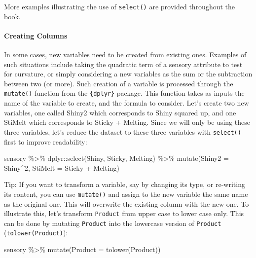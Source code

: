 \documentclass[
]{book}
\newenvironment{Shaded}{\begin{snugshade}}{\end{snugshade}}
\newcommand{\AttributeTok}[1]{\textcolor[rgb]{0.77,0.63,0.00}{#1}}
\newcommand{\DecValTok}[1]{\textcolor[rgb]{0.00,0.00,0.81}{#1}}
\newcommand{\FunctionTok}[1]{\textcolor[rgb]{0.00,0.00,0.00}{#1}}
\newcommand{\NormalTok}[1]{#1}
\newcommand{\SpecialCharTok}[1]{\textcolor[rgb]{0.00,0.00,0.00}{#1}}
\begin{document}
More examples illustrating the use of \texttt{select()} are provided throughout the book.

\hypertarget{creating-columns}{%
\paragraph{Creating Columns}\label{creating-columns}}

In some cases, new variables need to be created from existing ones. Examples of such situations include taking the quadratic term of a sensory attribute to test for curvature, or simply considering a new variables as the sum or the subtraction between two (or more). Such creation of a variable is processed through the \texttt{mutate()} function from the \texttt{\{dplyr\}} package. This function takes as inputs the name of the variable to create, and the formula to consider.
Let's create two new variables, one called Shiny2 which corresponds to Shiny squared up, and one StiMelt which corresponds to Sticky + Melting. Since we will only be using these three variables, let's reduce the dataset to these three variables with \texttt{select()} first to improve readability:

\begin{Shaded}
\begin{Highlighting}[]
\NormalTok{sensory }\SpecialCharTok{\%\textgreater{}\%} 
\NormalTok{  dplyr}\SpecialCharTok{::}\FunctionTok{select}\NormalTok{(Shiny, Sticky, Melting) }\SpecialCharTok{\%\textgreater{}\%} 
  \FunctionTok{mutate}\NormalTok{(}\AttributeTok{Shiny2 =}\NormalTok{ Shiny}\SpecialCharTok{\^{}}\DecValTok{2}\NormalTok{, }\AttributeTok{StiMelt =}\NormalTok{ Sticky }\SpecialCharTok{+}\NormalTok{ Melting)}
\end{Highlighting}
\end{Shaded}

Tip: If you want to transform a variable, say by changing its type, or re-writing its content, you can use \texttt{mutate()} and assign to the new variable the same name as the original one. This will overwrite the existing column with the new one. To illustrate this, let's transform \texttt{Product} from upper case to lower case only. This can be done by mutating \texttt{Product} into the lowercase version of \texttt{Product} (\texttt{tolower(Product)}):

\begin{Shaded}
\begin{Highlighting}[]
\NormalTok{sensory }\SpecialCharTok{\%\textgreater{}\%} 
  \FunctionTok{mutate}\NormalTok{(}\AttributeTok{Product =} \FunctionTok{tolower}\NormalTok{(Product))}
\end{Highlighting}
\end{Shaded}
\end{document}
